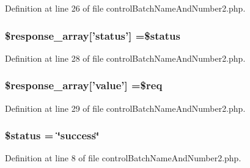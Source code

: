 Definition at line 26 of file control\-Batch\-Name\-And\-Number2.\-php.

\hypertarget{control_batch_name_and_number2_8php_acd0903a7a32e8397aefd0ce8b7dbd1ab}{
\subsubsection[{\$response\-\_\-array}]{\setlength{\rightskip}{0pt plus 5cm}\$response\-\_\-array\mbox{[}'status'\mbox{]} =\$status}}\label{control_batch_name_and_number2_8php_acd0903a7a32e8397aefd0ce8b7dbd1ab}


Definition at line 28 of file control\-Batch\-Name\-And\-Number2.\-php.

\hypertarget{control_batch_name_and_number2_8php_abbcbb7142adc1824bb5531445d2de0f0}{
\subsubsection[{\$response\-\_\-array}]{\setlength{\rightskip}{0pt plus 5cm}\$response\-\_\-array\mbox{[}'value'\mbox{]} =\$req}}\label{control_batch_name_and_number2_8php_abbcbb7142adc1824bb5531445d2de0f0}


Definition at line 29 of file control\-Batch\-Name\-And\-Number2.\-php.

\hypertarget{control_batch_name_and_number2_8php_a58391ea75f2d29d5d708d7050b641c33}{
\subsubsection[{\$status}]{\setlength{\rightskip}{0pt plus 5cm}\$status = \char`\"{}success\char`\"{}}}\label{control_batch_name_and_number2_8php_a58391ea75f2d29d5d708d7050b641c33}


Definition at line 8 of file control\-Batch\-Name\-And\-Number2.\-php.

